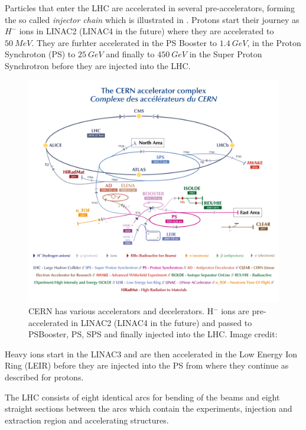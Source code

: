 Particles that enter the LHC are accelerated in several pre-accelerators, forming the so called
\emph{injector chain}\cite{Schindl1999} which is illustrated in .
Protons start their journey as $H^-$ ions in LINAC2 (LINAC4 in the future) where
they are accelerated to $\SI{50}{MeV}$. They are furhter accelerated in the PS Booster to $\SI{1.4}{GeV}$,
in the Proton Synchroton (PS) to $\SI{25}{GeV}$ and finally to $\SI{450}{GeV}$ in the Super Proton Synchrotron
before they are injected into the LHC.
%
\begin{figure}[ht]
    \centering
    \includegraphics[width=\textwidth]{CCC-v2019-final-white_small}
    \caption{CERN has various accelerators and decelerators. H$^-$ ions are pre-accelerated
    in LINAC2 (LINAC4 in the future) and passed to PSBooster, PS, SPS and finally injected into
    the LHC. Image credit: \cite{CERN_AccCmplx}}
    \label{fig_cern_acc_cmplx}
\end{figure}
%
Heavy ions start in the LINAC3 and are then accelerated in the Low Energy Ion Ring (LEIR) before they are injected into
the PS from where they continue as described for protons.

The LHC consists of eight identical arcs for bending of the beams and eight straight sections between the
arcs which contain the experiments, injection and extraction region and accelerating structures.

